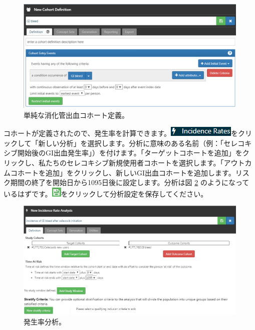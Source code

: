 \documentclass[
  11pt]{book}
\theoremstyle{definition}
\theoremstyle{definition}
\theoremstyle{definition}
\theoremstyle{definition}
\theoremstyle{remark}
\begin{document}
\begin{figure}

{\centering \includegraphics[width=1\linewidth]{images/SuggestedAnswers/giBleedCohortDefinition} 

}

\caption{単純な消化管出血コホート定義。}\label{fig:giBleedCohortDefinition}
\end{figure}

コホートが定義されたので、発生率を計算できます。\includegraphics{images/Characterization/atlasIncidenceMenuItem.png}をクリックして「新しい分析」を選択します。分析に意味のある名前（例：「セレコキシブ開始後のGI出血発生率」）を付けます。「ターゲットコホートを追加」をクリックし、私たちのセレコキシブ新規使用者コホートを選択します。「アウトカムコホートを追加」をクリックし、新しいGI出血コホートを追加します。リスク期間の終了を開始日から1095日後に設定します。分析は図 \ref{fig:irAnalysis} のようになっているはずです。\includegraphics{images/Cohorts/save.png}をクリックして分析設定を保存してください。

\begin{figure}

{\centering \includegraphics[width=1\linewidth]{images/SuggestedAnswers/irAnalysis} 

}

\caption{発生率分析。}\label{fig:irAnalysis}
\end{figure}
\end{document}
